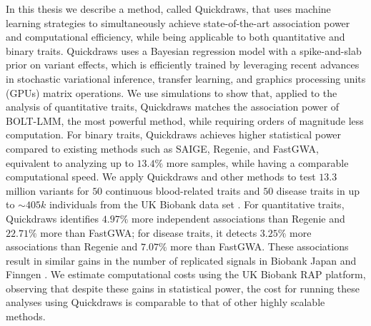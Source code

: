 %
In this thesis we describe a method, called Quickdraws, that uses machine learning strategies to simultaneously achieve state-of-the-art association power and computational efficiency, while being applicable to both quantitative and binary traits.
%
%
Quickdraws uses a Bayesian regression model with a spike-and-slab prior on variant effects, which is efficiently trained by leveraging recent advances in stochastic variational inference, transfer learning, and graphics processing units (GPUs) matrix operations.
%
We use simulations to show that, applied to the analysis of quantitative traits, Quickdraws matches the association power of BOLT-LMM, the most powerful method, while requiring orders of magnitude less computation. 
%
For binary traits, Quickdraws achieves higher statistical power compared to existing methods such as SAIGE, Regenie, and FastGWA, equivalent to analyzing up to $13.4\%$ more samples, while having a comparable computational speed.
%
We apply Quickdraws and other methods to test $13.3$ million variants for $50$ continuous blood-related traits and $50$ disease traits in up to ${\sim}405k$ individuals from the UK Biobank data set \cite{bycroft2018uk}.
%
For quantitative traits, Quickdraws identifies $4.97\%$ more independent associations than Regenie and $22.71\%$ more than FastGWA; for disease traits, it detects $3.25\%$ more associations than Regenie and $7.07\%$ more than FastGWA.
%
These associations result in similar gains in the number of replicated signals in Biobank Japan \cite{nagai2017overview} and Finngen \cite{kurki2023finngen}.
%
We estimate computational costs using the UK Biobank RAP platform, observing that despite these gains in statistical power, the cost for running these analyses using Quickdraws is comparable to that of other highly scalable methods.

